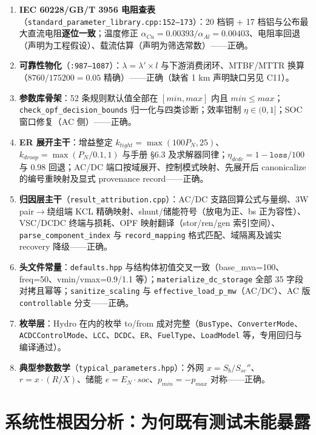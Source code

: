 \documentclass[11pt,a4paper,fontset=fandol]{ctexart}
\newcommand{\file}[1]{\texttt{#1}}
\begin{document}
\begin{enumerate}
  \item \textbf{IEC 60228/GB/T 3956 电阻查表}（\file{standard\_parameter\_library.cpp:152--173}）：20 档铜 $+$ 17 档铝与公布最大直流电阻\textbf{逐位一致}；温度修正 $\alpha_{Cu}=0.00393/\alpha_{Al}=0.00403$、电阻率回退（声明为工程假设）、载流估算（声明为筛选常数）——正确。
  \item \textbf{可靠性物化}（\file{:987--1087}）：$\lambda=\lambda'\times l$ 与下游消费闭环、MTBF/MTTR 换算（$8760/175200=0.05$ 精确）——正确（缺省 1 km 声明缺口另见 C11）。
  \item \textbf{参数库骨架}：52 条规则默认值全部在 $[min,max]$ 内且 $min\le max$；\texttt{check\_opf\_decision\_bounds} 归一化与四类诊断；效率钳制 $\eta\in(0,1]$；SOC 窗口修复（AC 侧）——正确。
  \item \textbf{ER 展开主干}：增益整定 $k_{tight}=\max(100P_N,25)$、$k_{droop}=\max(P_N/0.1,1)$ 与手册 \S 6.3 及求解器同律；$\eta_{dcdc}=1-\texttt{loss}/100$ 与 0.98 回退；AC/DC 端口按域展开、控制模式映射、先展开后 canonicalize 的编号重映射及显式 provenance record——正确。
  \item \textbf{归因层主干}（\file{result\_attribution.cpp}）：AC/DC 支路回算公式与量纲、3W pair$\to$绕组端 KCL 精确映射、shunt/储能符号（放电为正、bs 正为容性）、VSC/DCDC 终端与损耗、OPF 映射翻译（stor/ren/gen 索引空间）、\texttt{parse\_component\_index} 与 \texttt{record\_mapping} 格式匹配、域隔离及诚实 recovery 降级——正确。
  \item \textbf{头文件常量}：\file{defaults.hpp} 与结构体初值交叉一致（base\_mva=100、freq=50、vmin/vmax=0.9/1.1 等）；\file{materialize\_dc\_storage} 全部 35 字段对拷且幂等；\file{sanitize\_scaling} 与 \texttt{effective\_load\_p\_mw}（AC/DC）、AC 版 \texttt{controllable} 分支——正确。
  \item \textbf{枚举层}：Hydro 在内的枚举 to/from 成对完整（\file{BusType}、\file{ConverterMode}、\file{ACDCControlMode}、\file{LCC}、\file{DCDC}、\file{ER}、\file{FuelType}、\file{LoadModel} 等，专用回归与编译通过）。
  \item \textbf{典型参数数学}（\file{typical\_parameters.hpp}）：外网 $x=S_b/S_{sc}''$、$r=x\cdot(R/X)$、储能 $e=E_N\cdot soc$、$p_{min}=-p_{max}$ 对称——正确。
\end{enumerate}

\newpage
\section{系统性根因分析：为何既有测试未能暴露}
\label{sec:rootcause}
\end{document}
